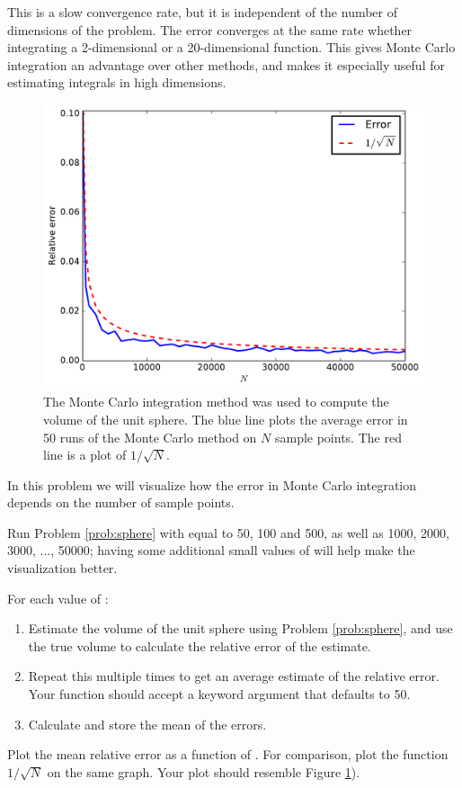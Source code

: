 This is a slow convergence rate, but it is independent of the number of dimensions of the problem.
The error converges at the same rate whether integrating a 2-dimensional or a 20-dimensional function.
This gives Monte Carlo integration an advantage over other methods, and makes it especially useful for estimating integrals in high dimensions.

\begin{figure}
\includegraphics[width=.7\textwidth]{figures/MC_error_2.pdf}
\caption{The Monte Carlo integration method was used to compute the volume of the unit sphere.
The blue line plots the average error in 50 runs of the Monte Carlo method on $N$ sample points.
The red line is a plot of $1/\sqrt{N}$. }
\label{fig:mc_error_2}
\end{figure}

\begin{problem}
In this problem we will visualize how the error in Monte Carlo integration depends on the number of sample points.

Run Problem \ref{prob:sphere} with  equal to 50, 100 and 500, as well as 1000, 2000, 3000, ..., 50000;
having some additional small values of  will help make the visualization better.

For each value of :
\begin{enumerate}
\item Estimate the volume of the unit sphere using Problem \ref{prob:sphere}, and use the true volume to calculate the relative error of the estimate.
\item Repeat this multiple times to get an average estimate of the relative error. Your function should accept a keyword argument  that defaults to 50.
\item Calculate and store the mean of the errors.
\end{enumerate}

Plot the mean relative error as a function of .
For comparison, plot the function $1/\sqrt{N}$ on the same graph.
Your plot should resemble Figure \ref{fig:mc_error_2}).

\end{problem}

